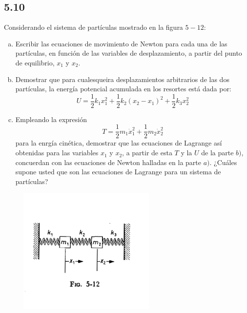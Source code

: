 \documentclass{article}
\begin{document}
\subsection*{5.10}
Considerando el sistema de partículas mostrado en la figura $5-12$:
\begin{enumerate}[a)]
    \item Escribir las ecuaciones de movimiento de Newton para cada una de las partículas, 
    en función de las variables de desplazamiento, a partir del punto de equilibrio, $x_1$ y $x_2$.
    \item Demostrar que para cualesqueira desplazamientos arbitrarios de las dos partículas, 
    la energía potencial acumulada en los resortes está dada por:
    \[ U = \frac{1}{2}k_1x_1^2+\frac{1}{2}k_2(x_2-x_1)^2 + \frac{1}{2}k_3x_2^2 \]
    \item Empleando la expresión 
    \[ T = \frac{1}{2}m_1\dot{x}_1^2+ \frac{1}{2}m_2\dot{x}_2^2 \]
    para la enrgía cinética, demostrar que las ecuaciones de Lagrange así obtenidas para 
    las variables $x_1$ y $x_2$, a partir de esta $T$ y la $U$ de la parte $b)$, concuerdan 
    con las ecuaciones de Newton halladas en la parte $a)$. ¿Cuáles supone usted que son 
    las ecuaciones de Lagrange para un sistema de partículas?    
\end{enumerate}
\begin{figure}[H]
    \centering
    \includegraphics[scale=1]{p4_springs.png}
\end{figure}
\end{document}
